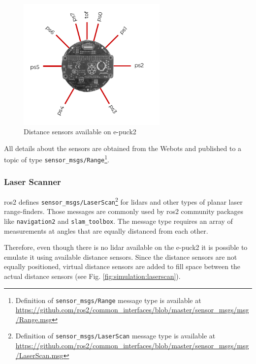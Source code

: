 \begin{figure}[H]
    \centering
    \includegraphics[width=0.65\textwidth]{simulation/figures/distance_sensors.pdf}
    \caption{Distance sensors available on e-puck2}
    \label{fig:simulation:distance_sensors}
\end{figure}

All details about the sensors are obtained from the Webots and published to a topic of type \texttt{sensor\_msgs/Range}\footnote{Definition of \texttt{sensor\_msgs/Range} message type is available at \url{https://github.com/ros2/common_interfaces/blob/master/sensor_msgs/msg/Range.msg}}.

\subsubsection{Laser Scanner}
\ac{ros2} defines \texttt{sensor\_msgs/LaserScan}\footnote{Definition of \texttt{sensor\_msgs/LaserScan} message type is available at \url{https://github.com/ros2/common_interfaces/blob/master/sensor_msgs/msg/LaserScan.msg}} for \acp{lidar} and other types of planar laser range-finders. Those messages are commonly used by \ac{ros2} community packages like \texttt{navigation2} and \texttt{slam\_toolbox}. The message type requires an array of measurements at angles that are equally distanced from each other. 

Therefore, even though there is no \ac{lidar} available on the e-puck2 it is possible to emulate it using available distance sensors. Since the distance sensors are not equally positioned, virtual distance sensors are added to fill space between the actual distance sensors (see Fig. \ref{fig:simulation:laserscan}).


